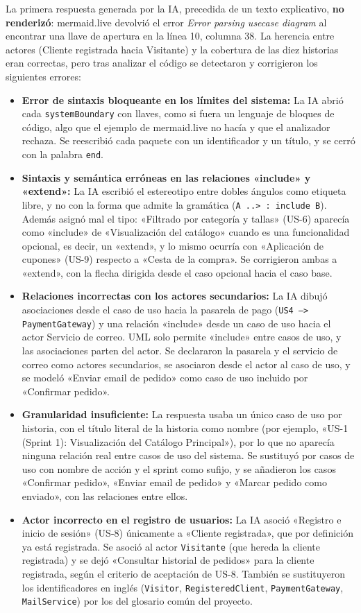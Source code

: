 La primera respuesta generada por la IA, precedida de un texto explicativo, \textbf{no renderizó}: mermaid.live devolvió el error \emph{Error parsing usecase diagram} al encontrar una llave de apertura en la línea 10, columna 38. La herencia entre actores (Cliente registrada hacia Visitante) y la cobertura de las diez historias eran correctas, pero tras analizar el código se detectaron y corrigieron los siguientes errores:
\begin{itemize}[leftmargin=*,nosep]
\item \textbf{Error de sintaxis bloqueante en los límites del sistema:} La IA abrió cada \texttt{systemBoundary} con llaves, como si fuera un lenguaje de bloques de código, algo que el ejemplo de mermaid.live no hacía y que el analizador rechaza. Se reescribió cada paquete con un identificador y un título, y se cerró con la palabra \texttt{end}.
\item \textbf{Sintaxis y semántica erróneas en las relaciones «include» y «extend»:} La IA escribió el estereotipo entre dobles ángulos como etiqueta libre, y no con la forma que admite la gramática (\texttt{A ..> : include B}). Además asignó mal el tipo: «Filtrado por categoría y tallas» (US-6) aparecía como «include» de «Visualización del catálogo» cuando es una funcionalidad opcional, es decir, un «extend», y lo mismo ocurría con «Aplicación de cupones» (US-9) respecto a «Cesta de la compra». Se corrigieron ambas a «extend», con la flecha dirigida desde el caso opcional hacia el caso base.
\item \textbf{Relaciones incorrectas con los actores secundarios:} La IA dibujó asociaciones desde el caso de uso hacia la pasarela de pago (\texttt{US4 --> PaymentGateway}) y una relación «include» desde un caso de uso hacia el actor Servicio de correo. UML solo permite «include» entre casos de uso, y las asociaciones parten del actor. Se declararon la pasarela y el servicio de correo como actores secundarios, se asociaron desde el actor al caso de uso, y se modeló «Enviar email de pedido» como caso de uso incluido por «Confirmar pedido».
\item \textbf{Granularidad insuficiente:} La respuesta usaba un único caso de uso por historia, con el título literal de la historia como nombre (por ejemplo, «US-1 (Sprint 1): Visualización del Catálogo Principal»), por lo que no aparecía ninguna relación real entre casos de uso del sistema. Se sustituyó por casos de uso con nombre de acción y el sprint como sufijo, y se añadieron los casos «Confirmar pedido», «Enviar email de pedido» y «Marcar pedido como enviado», con las relaciones entre ellos.
\item \textbf{Actor incorrecto en el registro de usuarios:} La IA asoció «Registro e inicio de sesión» (US-8) únicamente a «Cliente registrada», que por definición ya está registrada. Se asoció al actor \texttt{Visitante} (que hereda la cliente registrada) y se dejó «Consultar historial de pedidos» para la cliente registrada, según el criterio de aceptación de US-8. También se sustituyeron los identificadores en inglés (\texttt{Visitor}, \texttt{RegisteredClient}, \texttt{PaymentGateway}, \texttt{MailService}) por los del glosario común del proyecto.
\end{itemize}
